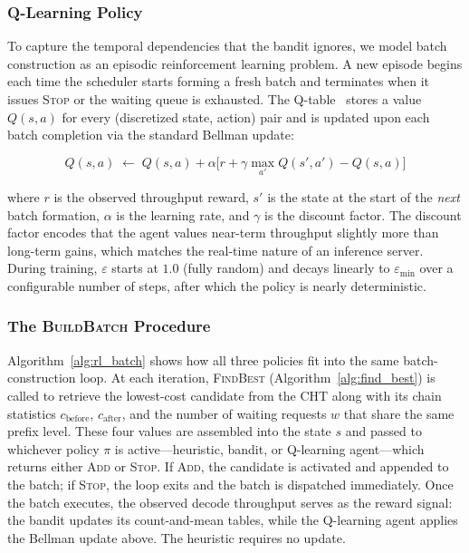 \subsubsection*{Q-Learning Policy}
To capture the temporal dependencies that the bandit ignores, we model batch construction as an episodic reinforcement learning problem. A new episode begins each time the scheduler starts forming a fresh batch and terminates when it issues \textsc{Stop} or the waiting queue is exhausted. The Q-table~\cite{watkins1992} stores a value $Q(s, a)$ for every (discretized state, action) pair and is updated upon each batch completion via the standard Bellman update:

\[
Q(s, a) \; \leftarrow\; Q(s, a) + \alpha\bigl[r + \gamma \max_{a'} Q(s', a') - Q(s, a)\bigr]
\]

where $r$ is the observed throughput reward, $s'$ is the state at the start of the \emph{next} batch formation, $\alpha$ is the learning rate, and $\gamma$ is the discount factor. The discount factor encodes that the agent values near-term throughput slightly more than long-term gains, which matches the real-time nature of an inference server. During training, $\varepsilon$ starts at $1.0$ (fully random) and decays linearly to $\varepsilon_{\min}$ over a configurable number of steps, after which the policy is nearly deterministic.

\subsubsection*{The \textsc{BuildBatch} Procedure}
Algorithm~\ref{alg:rl_batch} shows how all three policies fit into the same batch-construction loop. At each iteration, \textsc{FindBest} (Algorithm~\ref{alg:find_best}) is called to retrieve the lowest-cost candidate from the CHT along with its chain statistics $c_{\mathrm{before}}$, $c_{\mathrm{after}}$, and the number of waiting requests $w$ that share the same prefix level. These four values are assembled into the state $s$ and passed to whichever policy $\pi$ is active—heuristic, bandit, or Q-learning agent—which returns either \textsc{Add} or \textsc{Stop}. If \textsc{Add}, the candidate is activated and appended to the batch; if \textsc{Stop}, the loop exits and the batch is dispatched immediately. Once the batch executes, the observed decode throughput serves as the reward signal: the bandit updates its count-and-mean tables, while the Q-learning agent applies the Bellman update above. The heuristic requires no update. 

